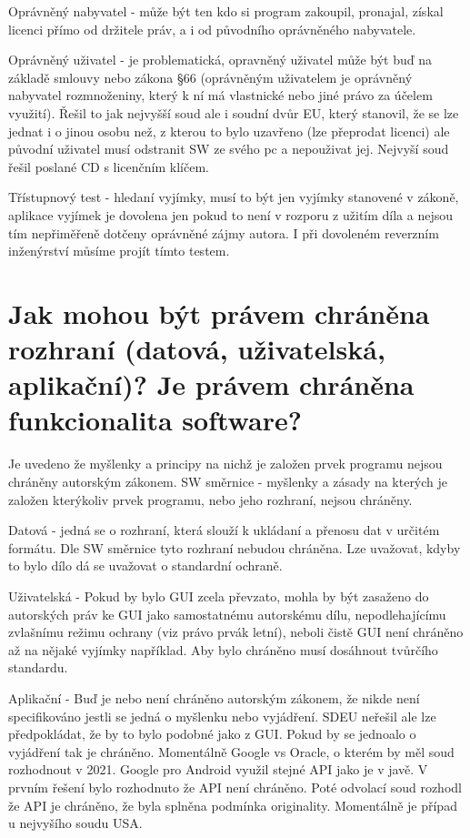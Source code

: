 \documentclass[12pt,a4paper,czech]{article}
\newcommand{\nadpis}[1]{{\section{#1}}}
\begin{document}
Oprávněný nabyvatel - může být ten kdo si program zakoupil, pronajal, získal licenci přímo od držitele práv, a i od původního oprávněného nabyvatele.

Oprávněný uživatel - je problematická, opravněný uživatel může být buď na základě smlouvy nebo zákona §66 (oprávněným uživatelem je oprávněný nabyvatel rozmnoženiny, který k ní má vlastnické nebo jiné právo za účelem využití). Řešil to jak nejvyšší soud ale i soudní dvůr EU, který stanovil, že se lze jednat i o jinou osobu než, z kterou to bylo uzavřeno (lze přeprodat licenci) ale původní uživatel musí odstranit SW ze svého pc a nepouživat jej. Nejvyší soud řešil poslané CD s licenčním klíčem.

Třístupnový test - hledaní vyjímky, musí to být jen vyjímky stanovené v zákoně, aplikace vyjímek je dovolena jen pokud to není v rozporu z užitím díla a nejsou tím nepřiměřeně dotčeny oprávněné zájmy autora. I při dovoleném reverzním inženýrství můsíme projít tímto testem.


\vspace{0.5cm} 
\nadpis{Jak mohou být právem chráněna rozhraní (datová, uživatelská, aplikační)? Je právem chráněna funkcionalita software?}

Je uvedeno že myšlenky a principy na nichž je založen prvek programu nejsou chráněny autorským zákonem. SW směrnice - myšlenky a zásady na kterých je založen kterýkoliv prvek programu, nebo jeho rozhraní, nejsou chráněny. 

Datová - jedná se o rozhraní, která slouží k ukládaní a přenosu dat v určitém formátu. Dle SW směrnice tyto rozhraní nebudou chráněna. Lze uvažovat, kdyby to bylo dílo dá se uvažovat o standardní ochraně.

Uživatelská - Pokud by bylo GUI zcela převzato, mohla by být zasaženo do autorských práv ke GUI jako samostatnému autorskému dílu, nepodlehajícímu zvlašnímu režimu ochrany (viz právo prvák letní), neboli čistě GUI není chráněno až na nějaké vyjímky například. Aby bylo chráněno musí dosáhnout tvůrčího standardu.

Aplikační - Buď je nebo není chráněno autorským zákonem, že nikde není specifikováno jestli se jedná o myšlenku nebo vyjádření. SDEU neřešil ale lze předpokládat, že by to bylo podobné jako z GUI. Pokud by se jednoalo o vyjádření tak je chráněno. Momentálně Google vs Oracle, o kterém by měl soud rozhodnout v 2021. Google pro Android využil stejné API jako je v javě. V prvním řešení bylo rozhodnuto že API není chráněno. Poté odvolací soud rozhodl že API je chráněno, že byla splněna podmínka originality. Momentálně je případ u nejvyšího soudu USA.
\end{document}
